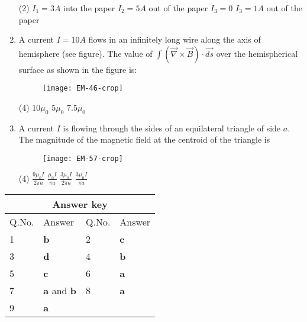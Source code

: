 \begin{enumerate}[ label=\color{ocre}\textbf{\arabic*.}]
\begin{figure}[H]
\begin{center}
		\end{center}
	\end{figure}
	\begin{tasks}(2)
		\task[\textbf{a.}]$I_{1}=3 A$ into the paper
		\task[\textbf{b.}] $I_{2}=5 A$ out of the paper
		\task[\textbf{c.}] $I_{3}=0$
		\task[\textbf{d.}] $I_{3}=1 A$ out of the paper
	\end{tasks}
	\item A current $I=10 A$ flows in an infinitely long wire along the axis of hemisphere (see figure). The value of $\int(\vec{\nabla} \times \vec{B}) \cdot \overrightarrow{d s}$ over the hemispherical surface as shown in the figure is:{}
	\begin{figure}[H]
		\begin{center}
			\texttt{[image: EM-46-crop]}
		\end{center}
	\end{figure}
	\begin{tasks}(4)
		\task[\textbf{a.}]$10 \mu_{0}$
		\task[\textbf{b.}] $5 \mu_{0}$
		\task[\textbf{d.}] $7.5 \mu_{0}$
	\end{tasks}
	\item A current $I$ is flowing through the sides of an equilateral triangle of side $a$. The magnitude of the magnetic field at the centroid of the triangle is{}
	\begin{figure}[H]
		\begin{center}
			\texttt{[image: EM-57-crop]}
		\end{center}
	\end{figure}
	\begin{tasks}(4)
		\task[\textbf{a.}]$\frac{9 \mu_{0} I}{2 \pi a}$
		\task[\textbf{b.}] $\frac{\mu_{0} I}{\pi a}$
		\task[\textbf{c.}]$\frac{3 \mu_{0} I}{2 \pi a}$
		\task[\textbf{d.}] $\frac{3 \mu_{0} I}{\pi a}$
	\end{tasks}
\end{enumerate}
\setlength\arrayrulewidth{1pt}
\begin{table}[H]
	\centering
	\begin{tabular}{|p{1.5cm}|p{1.5cm}||p{1.5cm}|p{1.5cm}|}
		\hline
		\multicolumn{4}{|c|}{\textbf{Answer key}}\\\hline\hline
		\rowcolor{ocrel}Q.No.&Answer&Q.No.&Answer\\\hline
		1&\textbf{b} &2&\textbf{c}\\\hline 
		3&\textbf{d} &4&\textbf{b}  \\\hline
		5&\textbf{c} &6&\textbf{a} \\\hline
		7&\textbf{a} and \textbf{b}&8&\textbf{a}\\\hline
		9&\textbf{a}& & \\\hline
		
	\end{tabular}
\end{table}
